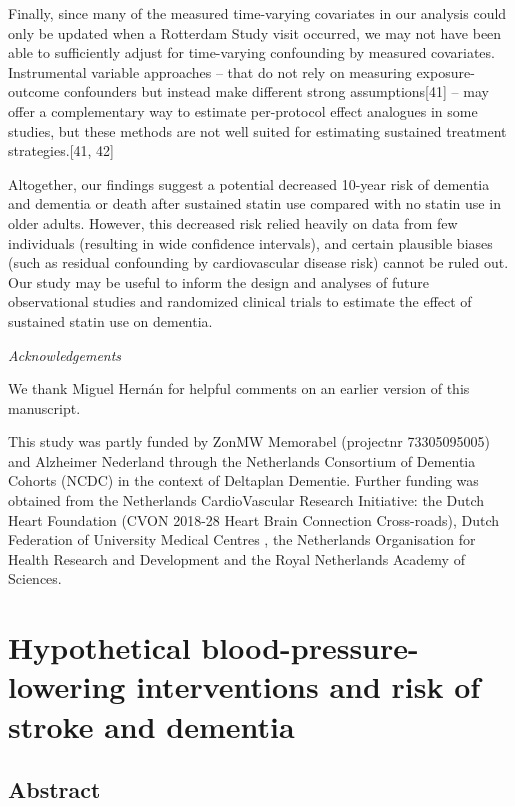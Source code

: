 \documentclass[
]{book}
\begin{document}
Finally, since many of the measured time-varying covariates in our analysis could only be
updated when a Rotterdam Study visit occurred, we may not have been able to sufficiently adjust for time-varying confounding by measured covariates. Instrumental variable approaches -- that do not rely on measuring exposure-outcome confounders but instead make different strong assumptions{[}41{]} -- may offer a complementary way to estimate per-protocol effect analogues in some studies, but these methods are not well suited for estimating sustained treatment strategies.{[}41, 42{]}

Altogether, our findings suggest a potential decreased 10-year risk of dementia and dementia or death after sustained statin use compared with no statin use in older adults. However, this decreased risk relied heavily on data from few individuals (resulting in wide confidence intervals), and certain plausible biases (such as residual confounding by cardiovascular disease risk) cannot be ruled out. Our study may be useful to inform the design and analyses of future observational studies and randomized clinical trials to estimate the effect of sustained statin use on dementia.

\emph{Acknowledgements}

We thank Miguel Hernán for helpful comments on an earlier version of this manuscript.

This study was partly funded by ZonMW Memorabel (projectnr 73305095005) and Alzheimer Nederland through the Netherlands Consortium of Dementia Cohorts (NCDC) in the context of Deltaplan Dementie. Further funding was obtained from the Netherlands CardioVascular Research Initiative: the Dutch Heart Foundation (CVON 2018-28 Heart Brain Connection Cross-roads), Dutch Federation of University Medical Centres , the Netherlands Organisation for Health Research and Development and the Royal Netherlands Academy of Sciences.

\hypertarget{chapter3}{%
\chapter{Hypothetical blood-pressure-lowering interventions and risk of stroke and dementia}\label{chapter3}}


\newpage

\hypertarget{abstract-1}{%
\section{Abstract}\label{abstract-1}}
\end{document}
